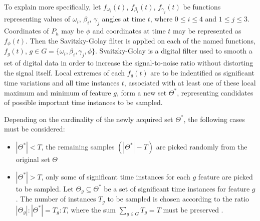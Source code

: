 To explain more specifically, let $f_{\omega_i}(t)$, $f_{\beta_i}(t)$, $f_{\gamma_j}(t)$ be functions representing values of $\omega_i$, $\beta_i$, $\gamma_j$ angles at time $t$, where $0 \leq i \leq 4$ and $1 \leq j \leq 3$. Coordinates of $P_h$ may be $\phi$ and coordinates at time $t$ may be represented as $f_{\phi}(t)$. Then the Savitzky-Golay filter \cite{savitzkty} is applied on each of the named functions, $f_g(t)$, $g \in G = \{\omega_i,\beta_i, \gamma_j, \phi\}$. Svaitzky-Golay is a digital filter used to smooth a set of digital data in order to increase the signal-to-noise ratio without distorting the signal itself. Local extremes of each $f_g(t)$ are to be indentified as significant time variations and all time instances $t$, associated with at least one of these local maximum and minimum of feature $g$, form a new set $\Theta^*$, representing candidates of possible important time instances to be sampled. 


Depending on the cardinality of the newly acquired set $\Theta^*$, the following cases must be considered:

\begin{itemize}
    \item $|\Theta^*| < T$, the remaining samples $(|\Theta^*|-T)$ are picked randomly from the original set $\Theta$
    \item $|\Theta^*| > T$, only some of significant time instances for each $g$ feature are picked to be sampled. Let $\Theta_g \subseteq \Theta^*$ be a set of significant time instances for feature $g$. The number of instances $T_g$ to be sampled is chosen according to the ratio $|\Theta_g|:|\Theta^*| = T_g:T$, where the sum $\sum_{g \in G}{T_g} = T$ must be preserved \cite{avola}.
\end{itemize}


